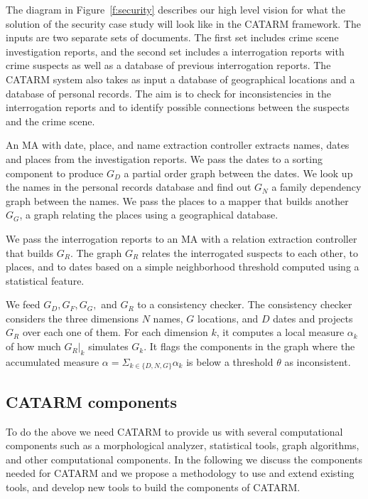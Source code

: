 \documentclass[12pt]{article}
\begin{document}
The diagram in Figure~\ref{f:security} describes our 
high level vision for what the solution of the 
security case study
will look like in the CATARM framework. 
The inputs are two separate sets of documents. 
The first set includes crime scene investigation reports, 
and the second set includes a 
interrogation reports with crime suspects as well as 
a database of previous interrogation reports. 
The CATARM system also takes as input a database of geographical
locations and a database of personal records. 
The aim is to check for inconsistencies in the interrogation
reports and to identify possible connections between the suspects
and the crime scene. 

An MA with date, place, and name extraction controller extracts
names, dates and places from the investigation reports. 
We pass the dates to a sorting component to produce $G_D$ 
a partial order graph between the dates. 
We look up the names in the personal records database and find out
$G_N$ a family dependency graph between the names. 
We pass the places to a mapper that builds another $G_G$,
a graph relating the places using a geographical database. 

We pass the interrogation reports to an MA with a relation 
extraction controller that builds $G_R$. 
The graph $G_R$ relates the interrogated suspects
to each other, to places, and to dates based on a simple
neighborhood threshold computed using a statistical feature. 

We feed $G_D, G_F, G_G,$ and $G_R$   
to a consistency checker.
The consistency checker considers the three dimensions 
$N$ names, $G$ locations, and $D$ dates and projects $G_R$
over each one of them.
For each dimension $k$, it computes a local measure 
$\alpha_k$ of how much $G_R|_k$ simulates $G_k$. 
It flags the components in the graph where the accumulated 
measure $\alpha= \Sigma_{k\in\{D,N,G\}} \alpha_k$ is
below a threshold $\theta$ as inconsistent. 

\subsection{CATARM components}
\label{s:design:components}

To do the above we need CATARM to provide us with several 
computational components such as a morphological analyzer, 
statistical tools, graph algorithms, and other computational
components. 
In the following we discuss the components needed for 
CATARM and we propose a methodology to 
use and extend existing tools, and develop new tools to
build the components of CATARM.
\end{document}

